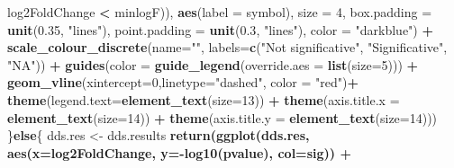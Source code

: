 \documentclass[
  12pt,
]{article}
\newenvironment{Shaded}{\begin{snugshade}}{\end{snugshade}}
\newcommand{\ControlFlowTok}[1]{\textcolor[rgb]{0.13,0.29,0.53}{\textbf{#1}}}
\newcommand{\DataTypeTok}[1]{\textcolor[rgb]{0.13,0.29,0.53}{#1}}
\newcommand{\DecValTok}[1]{\textcolor[rgb]{0.00,0.00,0.81}{#1}}
\newcommand{\FloatTok}[1]{\textcolor[rgb]{0.00,0.00,0.81}{#1}}
\newcommand{\KeywordTok}[1]{\textcolor[rgb]{0.13,0.29,0.53}{\textbf{#1}}}
\newcommand{\NormalTok}[1]{#1}
\newcommand{\OperatorTok}[1]{\textcolor[rgb]{0.81,0.36,0.00}{\textbf{#1}}}
\newcommand{\StringTok}[1]{\textcolor[rgb]{0.31,0.60,0.02}{#1}}
\begin{document}
\begin{Shaded}
\begin{Highlighting}[]
{{\StringTok{                                              }\NormalTok{log2FoldChange }\OperatorTok{<}\StringTok{ }\NormalTok{minlogF)),}
                             \KeywordTok{aes}\NormalTok{(}\DataTypeTok{label =}\NormalTok{ symbol),}
                             \DataTypeTok{size =} \DecValTok{4}\NormalTok{,}
                             \DataTypeTok{box.padding =} \KeywordTok{unit}\NormalTok{(}\FloatTok{0.35}\NormalTok{, }\StringTok{"lines"}\NormalTok{),}
                             \DataTypeTok{point.padding =} \KeywordTok{unit}\NormalTok{(}\FloatTok{0.3}\NormalTok{, }\StringTok{"lines"}\NormalTok{), }\DataTypeTok{color =} \StringTok{"darkblue"}\NormalTok{) }\OperatorTok{+}
\StringTok{             }\KeywordTok{scale_colour_discrete}\NormalTok{(}\DataTypeTok{name=}\StringTok{""}\NormalTok{,}
                                   \DataTypeTok{labels=}\KeywordTok{c}\NormalTok{(}\StringTok{"Not significative"}\NormalTok{, }\StringTok{"Significative"}\NormalTok{, }\StringTok{"NA"}\NormalTok{)) }\OperatorTok{+}
\StringTok{             }\KeywordTok{guides}\NormalTok{(}\DataTypeTok{color =} \KeywordTok{guide_legend}\NormalTok{(}\DataTypeTok{override.aes =} \KeywordTok{list}\NormalTok{(}\DataTypeTok{size=}\DecValTok{5}\NormalTok{))) }\OperatorTok{+}
\StringTok{             }\KeywordTok{geom_vline}\NormalTok{(}\DataTypeTok{xintercept=}\DecValTok{0}\NormalTok{,}\DataTypeTok{linetype=}\StringTok{"dashed"}\NormalTok{, }\DataTypeTok{color =} \StringTok{"red"}\NormalTok{)}\OperatorTok{+}
\StringTok{             }\KeywordTok{theme}\NormalTok{(}\DataTypeTok{legend.text=}\KeywordTok{element_text}\NormalTok{(}\DataTypeTok{size=}\DecValTok{13}\NormalTok{)) }\OperatorTok{+}
\StringTok{             }\KeywordTok{theme}\NormalTok{(}\DataTypeTok{axis.title.x =} \KeywordTok{element_text}\NormalTok{(}\DataTypeTok{size=}\DecValTok{14}\NormalTok{)) }\OperatorTok{+}
\StringTok{             }\KeywordTok{theme}\NormalTok{(}\DataTypeTok{axis.title.y =} \KeywordTok{element_text}\NormalTok{(}\DataTypeTok{size=}\DecValTok{14}\NormalTok{)))}
\NormalTok{  \}}\ControlFlowTok{else}\NormalTok{\{}
\NormalTok{    dds.res <-}\StringTok{ }\NormalTok{dds.results }\OperatorTok{%
    \KeywordTok{return}\NormalTok{(}\KeywordTok{ggplot}\NormalTok{(dds.res, }\KeywordTok{aes}\NormalTok{(}\DataTypeTok{x=}\NormalTok{log2FoldChange, }\DataTypeTok{y=}\OperatorTok{-}\KeywordTok{log10}\NormalTok{(pvalue), }\DataTypeTok{col=}\NormalTok{sig)) }\OperatorTok{+}
}}}
\end{Highlighting}
\end{Shaded}
\end{document}
